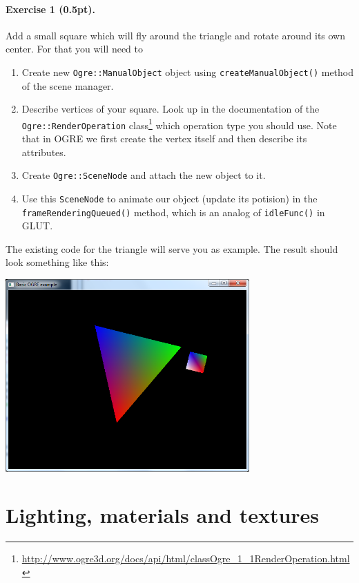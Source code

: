 \documentclass{article}
\newenvironment{exercise}[2]{\paragraph{Exercise #1 (#2pt).} }{
\medskip}
\begin{document}
\begin{exercise}{1}{0.5}
Add a small square which will fly around the triangle and rotate around its own center. For that you will need to
\begin{enumerate}
	\item Create new \verb#Ogre::ManualObject# object using \verb#createManualObject()# method of the scene manager.
	\item Describe vertices of your square. Look up in the documentation of the \\
\verb#Ogre::RenderOperation# class\footnote{\url{http://www.ogre3d.org/docs/api/html/classOgre_1_1RenderOperation.html}} which operation type you should use. Note that in OGRE we first create the vertex itself and then describe its attributes.
	\item Create \verb#Ogre::SceneNode# and attach the new object to it.
	\item Use this \verb#SceneNode# to animate our object (update its potision) in the \verb#frameRenderingQueued()# method, which is an analog of \verb#idleFunc()# in GLUT.
\end{enumerate}
The existing code for the triangle will serve you as example. The result should look something like this:
\begin{center}
\includegraphics[width=0.7\textwidth]{ex1.png}
\end{center}
\end{exercise}

\section{Lighting, materials and textures}
\end{document}
